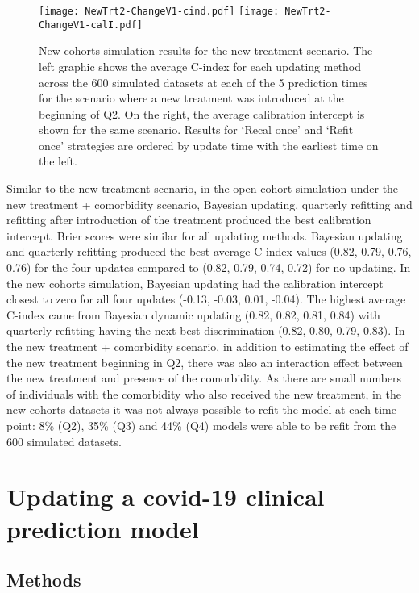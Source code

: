 \documentclass[]{article}
\begin{document}
\begin{figure}
	{\texttt{[image: NewTrt2-ChangeV1-cind.pdf]}} 
	{\texttt{[image: NewTrt2-ChangeV1-calI.pdf]}}
	\caption{New cohorts simulation results for the new treatment scenario. The left graphic shows the average C-index for each updating method across the 600 simulated datasets at each of the 5 prediction times for the scenario where a new treatment was introduced at the beginning of Q2. On the right, the average calibration intercept is shown for the same scenario. Results for `Recal once' and `Refit once' strategies are ordered by update time with the earliest time on the left. }
	\label{fig:newTrt2}
\end{figure}


Similar to the new treatment scenario, in the open cohort simulation under the new treatment + comorbidity scenario, Bayesian updating, quarterly refitting and refitting after introduction of the treatment produced the best calibration intercept. Brier scores were similar for all updating methods. Bayesian updating and quarterly refitting produced the best average C-index values (0.82, 0.79, 0.76, 0.76) for the four updates compared to (0.82, 0.79, 0.74, 0.72) for no updating. In the new cohorts simulation, Bayesian updating had the calibration intercept closest to zero for all four updates (-0.13, -0.03, 0.01, -0.04). The highest average C-index came from Bayesian dynamic updating (0.82, 0.82, 0.81, 0.84) with quarterly refitting having the next best discrimination (0.82, 0.80, 0.79, 0.83). In the new treatment + comorbidity scenario, in addition to estimating the effect of the new treatment beginning in Q2, there was also an interaction effect between the new treatment and presence of the comorbidity. As there are small numbers of individuals with the comorbidity who also received the new treatment, in the new cohorts datasets it was not always possible to refit the model at each time point: 8\% (Q2), 35\% (Q3) and 44\% (Q4) models were able to be refit from the 600 simulated datasets. 



\section{Updating a covid-19 clinical prediction model}
\label{sec:MotivatingApp}

\subsection{Methods}
\label{sec:exMeths}
\end{document}
